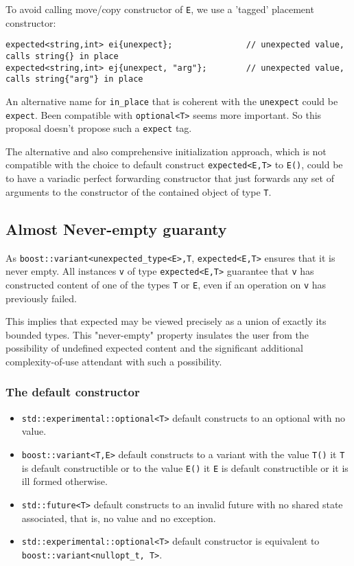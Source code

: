 \documentclass[a4paper,10pt]{article}
\newcommand{\cpp}[1]{\lstinline{#1}}
\begin{document}
To avoid calling move/copy constructor of \cpp{E}, we use a 'tagged' placement constructor: 

\begin{lstlisting}
expected<string,int> ei{unexpect};               // unexpected value, calls string{} in place
expected<string,int> ej{unexpect, "arg"};        // unexpected value, calls string{"arg"} in place
\end{lstlisting}

An alternative name for \cpp{in_place} that is coherent with the \cpp{unexpect} could be \cpp{expect}. Been compatible with \cpp{optional<T>} seems more important. So this proposal doesn't propose such a \cpp{expect} tag.

The alternative and also comprehensive initialization approach, which is not compatible with the choice to default construct \cpp{expected<E,T>} to \cpp{E()}, could be to have a variadic perfect forwarding constructor that just forwards any set of arguments to the constructor of the contained object of type \cpp{T}. 
 
\subsection{Almost Never-empty guaranty}

As \cpp{boost::variant<unexpected_type<E>,T}, \cpp{expected<E,T>} ensures that it is never empty.
All instances \cpp{v} of type \cpp{expected<E,T>} guarantee that \cpp{v} has constructed content of one of the types \cpp{T} or \cpp{E}, even if an operation on \cpp{v} has previously failed.

This implies that expected may be viewed precisely as a union of exactly its bounded types. This "never-empty" property insulates the user from the possibility of undefined expected content and the significant additional complexity-of-use attendant with such a possibility.

\subsubsection{The default constructor}

\begin{itemize}
\item \cpp{std::experimental::optional<T>} default constructs to an optional with no value. 
\item \cpp{boost::variant<T,E>} default constructs to a variant with the value \cpp{T()} it \cpp{T} is default constructible or to the value \cpp{E()} it \cpp{E} is default constructible or it is ill formed otherwise. 
\item \cpp{std::future<T>} default constructs to an invalid future with no shared state associated, that is, no value and no exception.
\item \cpp{std::experimental::optional<T>} default constructor is equivalent to \cpp{boost::variant<nullopt_t, T>}.
\end{itemize}
\end{document}
